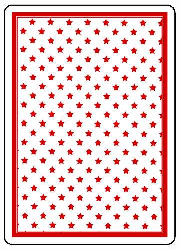 \documentclass[10pt]{beamer}
\begin{document}
\begin{frame}
\begin{columns}
\begin{column}{7cm}
\begin{figure}
\begin{subfigure}{.15\linewidth}
      \includegraphics[width=\linewidth]{im/back.eps}
     \end{subfigure}
     \begin{subfigure}{.15\linewidth}

\end{subfigure}
\end{figure}
\end{column}
\end{columns}
\end{frame}
\end{document}
